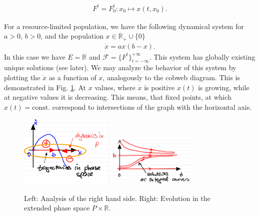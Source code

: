 \begin{align}
	\boxed{ F^{t} = F_{0}^{t}: x_0 \mapsto x(t,x_0).}
\end{align}
\begin{ex}
	For a resource-limited population, we have the following dynamical system for $a> 0$, $b> 0$, and the population $x\in \mathbb{R}_+ \cup \{0\}$
	\begin{align}
		\dot{x} = ax(b-x).
	\end{align}
	In this case we have $E=\mathbb{R}$ and $\mathcal{F} = \{F^{t}\}_{t=-\infty }^{+\infty }$. This system has globally existing unique solutions (see later).	We may analyze the behavior of this system by plotting the $\dot{x}$ as a function of $x$, analogously to the cobweb diagram. This is demonstrated in Fig. \ref{fig:intro:3}. At $x$ values, where $\dot{x}$ is positive $x(t)$ is growing, while at negative values it is decreasing. This means, that fixed points, at which $x(t)=\text{const.}$ correspond to intersections of the graph with the horizontal axis. 
	\begin{figure}[H]
		\centering
		\includegraphics[width=0.4\textwidth]{figures/intro/3RHS.png}	
		\hspace{0.05\textwidth}
		\includegraphics[width=0.4\textwidth]{figures/intro/4solutions.png}
		\caption{Left: Analysis of the right hand side. Right: Evolution in the extended phase space $P \times \mathbb{R}$.}
		\label{fig:intro:3}
	\end{figure}

\end{ex}

